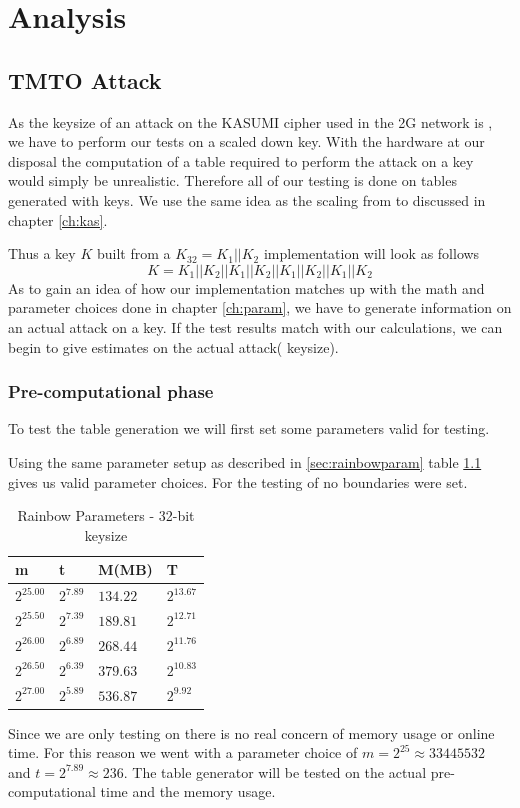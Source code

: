 \chapter{Analysis}
\label{ch:anal}

\section{TMTO Attack}
As the keysize of an attack on the KASUMI cipher used in the 2G
network is , we have to perform our tests on a scaled down
key. With the hardware at our disposal the computation of a table
required to perform the attack on a  key would simply be
unrealistic. Therefore all of our testing is done on tables generated
with  keys. We use the same idea as the scaling from  to
 discussed in chapter \ref{ch:kas}.

Thus a key $K$ built from a  $K_{32} = K_1 || K_2$  implementation will
look as follows
\[K = K_1 || K_2 || K_1 || K_2 || K_1 || K_2 || K_1 || K_2\]
As to gain an idea of how our implementation matches up with
the math and parameter choices done in chapter \ref{ch:param}, we have to generate
information on an actual attack on a  key. If the  test
results match with our calculations, we can begin to give estimates
on the actual attack( keysize).
\subsection{Pre-computational phase}
To test the table generation we will first set some parameters
valid for  testing.

Using the same parameter setup as described in \ref{sec:rainbowparam}
table \ref{tab:rainparam32} gives us valid parameter choices. For the
testing of  no boundaries were set.
\begin{table}[H]
  \centering
  \begin{tabular}{llll}
    m & t & M(MB) & T \\ \hline
    $2^{25.00}$ & $2^{7.89}$ & $134.22$ & $2^{13.67}$ \\
    $2^{25.50}$ & $2^{7.39}$ & $189.81$ & $2^{12.71}$ \\
    $2^{26.00}$ & $2^{6.89}$ & $268.44$ & $2^{11.76}$ \\
    $2^{26.50}$ & $2^{6.39}$ & $379.63$ & $2^{10.83}$ \\
    $2^{27.00}$ & $2^{5.89}$ & $536.87$ & $2^{9.92}$ \\
  \end{tabular}
  \caption{Rainbow Parameters - 32-bit keysize}
  \label{tab:rainparam32}
\end{table}
Since we are only testing on  there is no real concern of
memory usage or online time. For this reason we went with a parameter
choice of $m=2^{25} \approx 33445532$ and $t= 2^{7.89} \approx
236$. The table generator will be tested on the actual
pre-computational time and the memory usage.


